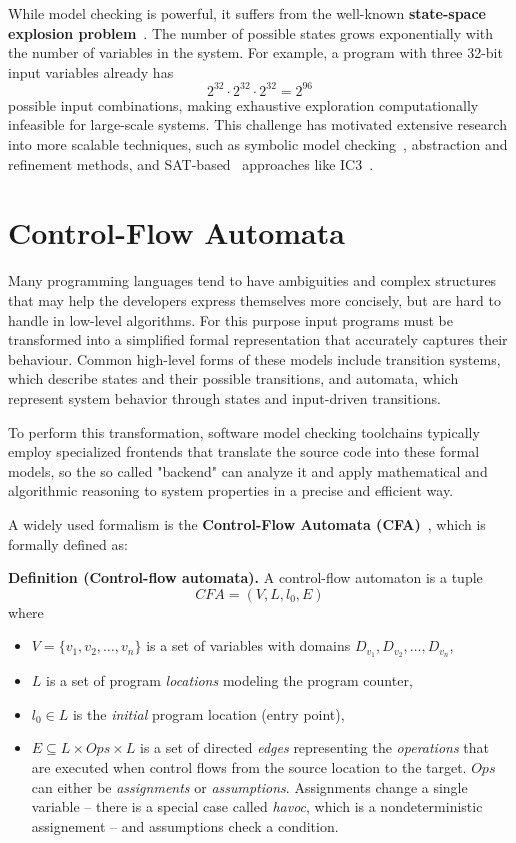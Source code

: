 While model checking is powerful, it suffers from the well-known \textbf{state-space explosion problem}~\cite{statespaceexplosionproblem}. The number of possible states grows exponentially with the number of variables in the system. For example, a program with three 32-bit input variables already has
\[
2^{32} \cdot 2^{32} \cdot 2^{32} = 2^{96}
\]
possible input combinations, making exhaustive exploration computationally infeasible for large-scale systems. This challenge has motivated extensive research into more scalable techniques, such as symbolic model checking~\cite{symbolicMC}, abstraction and refinement methods\cite{boundedMC}, and SAT-based~\cite{SMT-LIB} approaches like IC3~\cite{ic3}.

\section{Control-Flow Automata}\label{sec:cfa}

Many programming languages tend to have ambiguities and complex structures that may help the developers express themselves more concisely, but are hard to handle in low-level algorithms. For this purpose input programs must be transformed into a simplified formal representation that accurately captures their behaviour. Common high-level forms of these models include transition systems, which describe states and their possible transitions, and automata, which represent system behavior through states and input-driven transitions.

To perform this transformation, software model checking toolchains typically employ specialized frontends that translate the source code into these formal models, so the so called "backend" can analyze it and apply mathematical and algorithmic reasoning to system properties in a precise and efficient way.

A widely used formalism is the \textbf{Control-Flow Automata (CFA)}~\cite{cfa}, which is formally defined as:

\noindent\textbf{Definition \label{def:cfa}(Control-flow automata).} 
A control-flow automaton is a tuple 
\[
\textit{CFA} = (V, L, l_0, E)
\]
where
\begin{itemize}
  \item $V = \{v_1, v_2, \ldots, v_n\}$ is a set of variables with domains $D_{v_1}, D_{v_2}, \ldots, D_{v_n}$,
  \item $L$ is a set of program \textit{locations} modeling the program counter,
  \item $l_0 \in L$ is the \textit{initial} program location (entry point),
  \item $E \subseteq L \times Ops \times L$ is a set of directed \textit{edges} representing the \textit{operations} that are executed when control flows from the source location to the target. $ Ops $ can either be \textit{assignments} or \textit{assumptions}. Assignments change a single variable -- there is a special case called \textit{havoc}, which is a nondeterministic assignement -- and assumptions check a condition.
\end{itemize}

